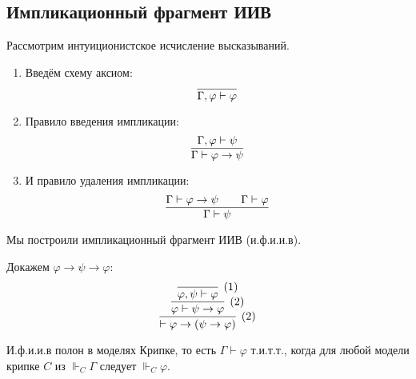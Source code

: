 \subsection{\texorpdfstring{Импликационный фрагмент ИИВ}{Implication fragment of intuitionistic logic}}

\begin{definition}
    Рассмотрим интуиционистское исчисление высказываний.
    \begin{enumerate}
        \item Введём схему аксиом:
        \[
            \infer{\Gamma, \varphi \vdash \varphi}{}
        \]
        \item Правило введения импликации:
        \[
            \infer{\Gamma \vdash \varphi \rightarrow \psi}{\Gamma, \varphi \vdash \psi}
        \]
        \item И правило удаления импликации:
        \[
            \infer{\Gamma \vdash \psi}{\Gamma \vdash \varphi \rightarrow \psi && \Gamma \vdash \varphi}
        \]
    \end{enumerate}

    Мы построили импликационный фрагмент ИИВ (и.ф.и.и.в).
\end{definition}

\begin{example} Докажем $\varphi \rightarrow \psi \rightarrow \varphi$:
\[
    \infer[(2)]
        { \vdash \varphi \rightarrow (\psi \rightarrow \varphi) }
        { \infer[(2)]
            { \varphi \vdash \psi \rightarrow \varphi }
            { \infer[(1)]
                { \varphi, \psi \vdash \varphi}
                {}
            }
        }
\]
\end{example}

\begin{theorem}
    И.ф.и.и.в полон в моделях Крипке, то есть $\Gamma \vdash \varphi$ т.и.т.т.,
    когда для любой модели крипке $C$ из $\Vdash_C \Gamma$ следует $\Vdash_C \varphi$.
\end{theorem}

